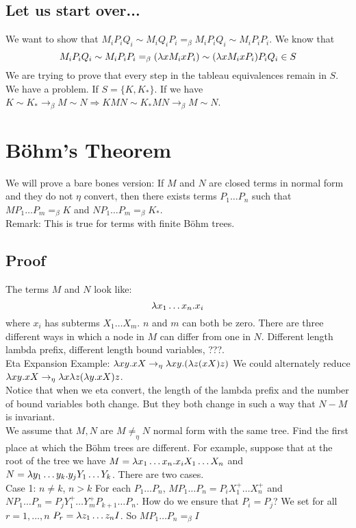 \subsection{Let us start over...}
We want to show that $M_iP_iQ_i \sim M_iQ_iP_i =_\beta M_iP_iQ_i \sim M_iP_iP_i$. We know that
\begin{equation*}
  M_iP_iQ_i \sim M_iP_iP_i =_\beta (\lambda x M_i x P_i) \sim (\lambda x M_i x P_i)P_iQ_i \in S
\end{equation*}
We are trying to prove that every step in the tableau equivalences remain in $S$.\\

We have a problem. If $S = \{K,K_*\}$. If we have $K \sim K_* \rightarrow_\beta M \sim N \Rightarrow KMN \sim K_*MN \rightarrow_\beta M \sim N$.

\section{B\"ohm's Theorem}
We will prove a bare bones version: If $M$ and $N$ are closed terms in normal form and they do not $\eta$ convert, then there exists terms $P_1\ldots P_n$ such that $MP_1\ldots P_m =_\beta K$ and $NP_1\ldots P_m =_\beta K_*$.\\

Remark: This is true for terms with finite B\"ohm trees.\\

\subsection{Proof}
The terms $M$ and $N$ look like:
\begin{equation*}
  \lambda x_1\ldots x_n.x_i
\end{equation*}
where $x_i$ has subterms $X_1\ldots X_m$. $n$ and $m$ can both be zero. There are three different ways in which a node in $M$ can differ from one in $N$. Different length lambda prefix, different length bound variables, ???.\\

Eta Expansion Example: $\lambda xy.xX \rightarrow_\eta \lambda xy.(\lambda z(xX)z)$ We could alternately reduce $\lambda xy.xX \rightarrow_\eta \lambda x \lambda z (\lambda y.xX)z$.\\

Notice that when we eta convert, the length of the lambda prefix and the number of bound variables both change. But they both change in such a way that $N - M$ is invariant.\\

We assume that $M,N$ are $M \not=_\eta N$ normal form with the same tree. Find the first place at which the B\"ohm trees are different. For example, suppose that at the root of the tree we have $M = \lambda x_1\ldots x_n . x_iX_1\ldots X_n$ and $N = \lambda y_1\ldots y_k . y_jY_1\ldots Y_k$. There are two cases.\\

Case 1: $n \not= k$, $n > k$ For each $P_1\ldots P_n$, $MP_1\ldots P_n = P_iX_1^+\ldots X_n^+$ and $NP_1\ldots P_n = P_jY_1^+\ldots Y_m^+P_{k+1}\ldots P_n$. How do we ensure that $P_i = P_j$? We set for all $r = 1,\ldots,n$ $P_r = \lambda z_1\ldots z_{n}I$. So $MP_1\ldots P_n =_\beta I$